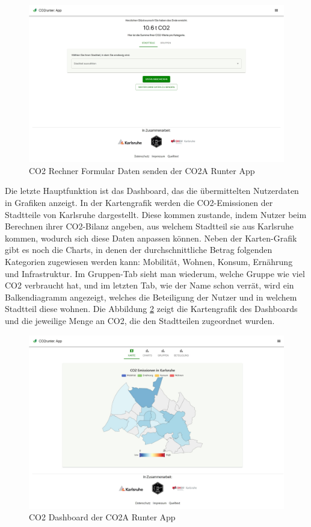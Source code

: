 \begin{figure}[h]
    \centering
    \includegraphics[width=1\textwidth]{images/02/CO2-Runter-App-Daten-Senden.jpeg}
    \caption{CO2 Rechner Formular Daten senden der CO2A Runter App}
    \label{fig:co2runterapp-send}
\end{figure}

Die letzte Hauptfunktion ist das Dashboard, das die übermittelten Nutzerdaten in Grafiken anzeigt. In der Kartengrafik werden die CO2-Emissionen der Stadtteile von Karlsruhe dargestellt. Diese kommen zustande, indem Nutzer beim Berechnen ihrer CO2-Bilanz angeben, aus welchem Stadtteil sie aus Karlsruhe kommen, wodurch sich diese Daten anpassen können. Neben der Karten-Grafik gibt es noch die Charts, in denen der durchschnittliche Betrag folgenden Kategorien zugewiesen werden kann: Mobilität, Wohnen, Konsum, Ernährung und Infrastruktur. Im Gruppen-Tab sieht man wiederum, welche Gruppe wie viel CO2 verbraucht hat, und im letzten Tab, wie der Name schon verrät, wird ein Balkendiagramm angezeigt, welches die Beteiligung der Nutzer und in welchem Stadtteil diese wohnen. Die Abbildung \ref{fig:co2runterapp-dashboard} zeigt die Kartengrafik des Dashboards und die jeweilige Menge an CO2, die den Stadtteilen zugeordnet wurden.

\newpage

\begin{figure}[h]
    \centering
    \includegraphics[width=1\textwidth]{images/02/CO2-Runter-App-Dashboard.jpeg}
    \caption{CO2 Dashboard der CO2A Runter App}
    \label{fig:co2runterapp-dashboard}
\end{figure}

